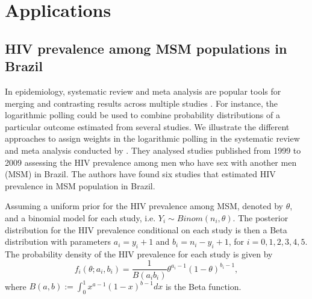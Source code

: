 \documentclass[a4paper, notitlepage, 10pt]{article}
\begin{document}
%
%

\section*{Applications}

\label{sec:apps}

\subsection*{HIV prevalence among MSM populations in Brazil}

In epidemiology, systematic review and meta analysis are popular tools for merging and contrasting results across multiple studies \citep[Chapter 33]{Rothman2008}. 
For instance, the logarithmic polling could be used to combine probability distributions of a particular outcome estimated from several studies. 
We illustrate the different approaches to assign weights in the logarithmic polling in the systematic review and meta analysis conducted by \citet{malta2010hiv}. 
They analysed studies published from 1999 to 2009 assessing the HIV prevalence among men who have sex with another men (MSM) in Brazil. 
The authors have found six studies that estimated HIV prevalence in MSM population in Brazil. 

Assuming a uniform prior for the HIV prevalence among MSM, denoted by $\theta$, and a binomial model for each study, i.e. $Y_i \sim Binom(n_i, \theta)$. 
The posterior distribution for the HIV prevalence conditional on each study is then a Beta distribution with parameters $a_i = y_i + 1$ and $b_i = n_i - y_i + 1$, for $i=0,1,2,3,4,5$. 
The probability density of the HIV prevalence for each study is given by
$$f_i(\theta;a_i, b_i) = \frac{1}{B(a_i b_i)} \theta^{a_i-1}(1-\theta)^{b_i-1},$$
where $B(a,b) := \int_{0}^{1} x^{a-1}(1-x)^{b-1}dx$ is the Beta function.
\end{document}
